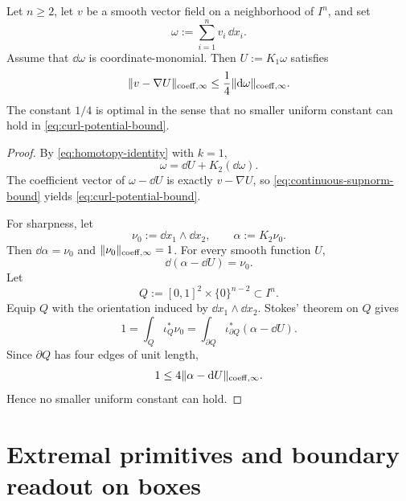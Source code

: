 \begin{corollary}
\label{cor:curl-reconstruction}
Let $n\ge 2$, let $v$ be a smooth vector field on a neighborhood of $I^n$, and
set
\[
\omega:=\sum_{i=1}^n v_i\,\dd x_i.
\]
Assume that $\dd\omega$ is coordinate-monomial. Then
$U:=K_1\omega$ satisfies
\begin{equation}
\label{eq:curl-potential-bound}
\lVert v-\nabla U \rVert_{\mathrm{coeff},\infty}\le
\frac14\lVert \mathrm{d}\omega \rVert_{\mathrm{coeff},\infty}.
\end{equation}
The constant $1/4$ is optimal in the sense that no smaller uniform constant can
hold in \eqref{eq:curl-potential-bound}.
\end{corollary}

\begin{proof}
By \eqref{eq:homotopy-identity} with $k=1$,
\[
\omega=\dd U+K_2(\dd\omega).
\]
The coefficient vector of $\omega-\dd U$ is exactly $v-\nabla U$, so
\eqref{eq:continuous-supnorm-bound} yields \eqref{eq:curl-potential-bound}.

For sharpness, let
\[
\nu_0:=\dd x_1\wedge \dd x_2,
\qquad
\alpha:=K_2\nu_0.
\]
Then $\dd\alpha=\nu_0$ and $\lVert \nu_0 \rVert_{\mathrm{coeff},\infty}=1$. For every smooth
function $U$,
\[
\dd(\alpha-\dd U)=\nu_0.
\]
Let
\[
Q:=[0,1]^2\times\{0\}^{n-2}\subset I^n.
\]
Equip $Q$ with the orientation induced by $\dd x_1\wedge\dd x_2$.
Stokes' theorem on $Q$ gives
\[
1
=
\int_Q \iota_Q^\ast\nu_0
=
\int_{\partial Q}\iota_{\partial Q}^\ast(\alpha-\dd U).
\]
Since $\partial Q$ has four edges of unit length,
\[
1\le 4\lVert \alpha-\mathrm{d} U \rVert_{\mathrm{coeff},\infty}.
\]
Hence no smaller uniform constant can hold.
\end{proof}

\section{Extremal primitives and boundary readout on boxes}
